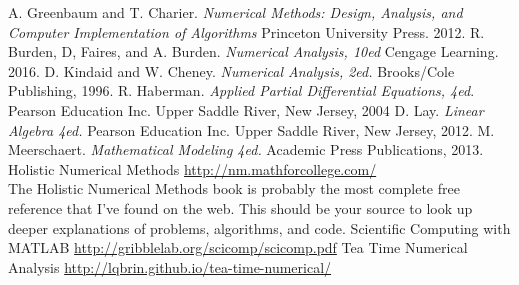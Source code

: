 \documentclass[12pt,oneside]{book}
\theoremstyle{definition}
\begin{document}
\begin{appendix}







\begin{thebibliography}{99}
         A. Greenbaum and T. Charier. {\it Numerical Methods: Design,
            Analysis, and Computer Implementation of Algorithms} Princeton University
            Press. 2012.
         R. Burden, D, Faires, and A. Burden. {\it Numerical Analysis,
            10ed} Cengage Learning. 2016.
         D. Kindaid and W. Cheney. {\it Numerical Analysis, 2ed.}
            Brooks/Cole Publishing, 1996.
         R. Haberman. {\it Applied Partial Differential Equations,
        4ed}.  Pearson Education Inc. Upper Saddle River, New Jersey, 2004
         D. Lay. {\it Linear Algebra 4ed.} Pearson Education Inc. Upper
        Saddle River, New Jersey, 2012.
         M. Meerschaert. {\it Mathematical Modeling 4ed.} Academic
        Press Publications, 2013.
         Holistic Numerical Methods
        \href{http://nm.mathforcollege.com/}{http://nm.mathforcollege.com/}\\
        The Holistic Numerical Methods book is probably the most complete free reference
        that I've found on the web.  This should be your source to look up deeper
        explanations of problems, algorithms, and code.
         Scientific Computing with MATLAB
        \href{http://gribblelab.org/scicomp/scicomp.pdf}{http://gribblelab.org/scicomp/scicomp.pdf}
         Tea Time Numerical Analysis
        \href{http://lqbrin.github.io/tea-time-numerical/}{http://lqbrin.github.io/tea-time-numerical/}
\end{thebibliography}
\end{appendix}
\end{document}
